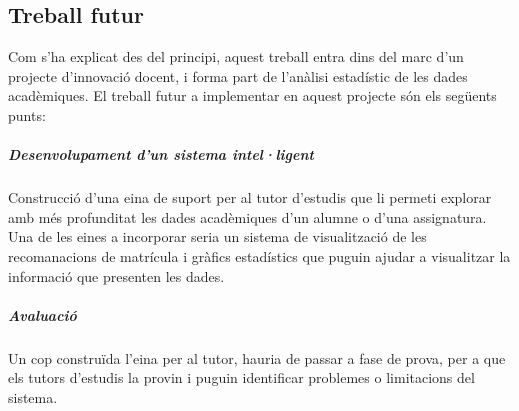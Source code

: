 \documentclass[12pt,a4paper,catalan]{article}
\begin{document}
\subsection{Treball futur}
Com s'ha explicat des del principi, aquest treball entra dins del marc d'un projecte d'innovació docent, i forma part de l'anàlisi estadístic de les dades acadèmiques. El treball futur a implementar en aquest projecte són els següents punts:

\subparagraph{Desenvolupament d'un sistema intel·ligent} 
Construcció d'una eina de suport per al tutor d'estudis que li permeti explorar amb més profunditat les dades acadèmiques d'un alumne o d'una assignatura. Una de les eines a incorporar seria un sistema de visualització de les recomanacions de matrícula i gràfics estadístics que puguin ajudar a visualitzar la informació que presenten les dades.

\subparagraph{Avaluació}
Un cop construïda l'eina per al tutor, hauria de passar a fase de prova, per a que els tutors d'estudis la provin i puguin identificar problemes o limitacions del sistema.

\newpage
\end{document}

